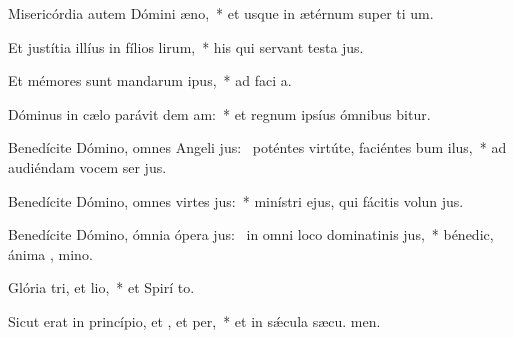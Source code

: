\item Misericórdia autem Dómini  æno,~* et usque in ætérnum super ti um.
\item Et justítia illíus in fílios lirum,~* his qui servant testa jus.
\item Et mémores sunt mandarum ipus,~* ad faci a.
\item Dóminus in cælo parávit dem am:~* et regnum ipsíus ómnibus bitur.
\item Benedícite Dómino, omnes Angeli jus:~\pscross{} poténtes virtúte, faciéntes bum ilus,~* ad audiéndam vocem ser jus.
\item Benedícite Dómino, omnes virtes jus:~* minístri ejus, qui fácitis volun jus.
\item Benedícite Dómino, ómnia ópera jus:~\pscross{} in omni loco dominatinis jus,~* bénedic, ánima , mino.
\item Glória tri, et lio,~* et Spirí to.
\item Sicut erat in princípio, et , et per,~* et in sǽcula sæcu. men.
